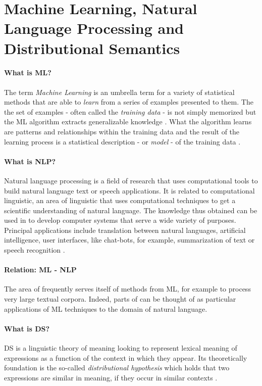 \documentclass{article}
\begin{document}
\section{Machine Learning, Natural Language Processing and Distributional Semantics}\hypertarget{sec2}{ }
\paragraph{What is ML?}
The term \emph{Machine Learning} is an umbrella term for a variety of statistical methods that are able to \emph{learn} from a series of examples presented to them. The the set of examples - often called the \emph{training data} - is not simply memorized but the ML algorithm extracts generalizable knowledge \cite{domingos2012few}.
 What the algorithm learns are patterns and relationships within the training data and the result of the learning process is a statistical description - or \emph{model} - of the training data \cite{fayyad2001digital}.
\paragraph{What is NLP?}
Natural language processing is a field of research that uses computational tools to build natural language text or speech applications. It is related to computational linguistic, an area of linguistic that uses computational techniques to get a scientific understanding of natural language. The knowledge thus obtained can be used in  to develop computer systems that serve a wide variety of purposes. Principal applications include translation between natural languages, artificial intelligence, user interfaces, like chat-bots, for example, summarization of text or speech recognition \cite{chowdhury2003natural}.
\paragraph{Relation: ML - NLP}
The area of  frequently serves itself of methods from ML, for example to process very large textual corpora. Indeed, parts of  can be thought of as particular applications of ML techniques to the domain of natural language.
\paragraph{What is DS?}
DS is a linguistic theory of meaning looking to represent lexical meaning of expressions as a function of the context in which they appear. Its theoretically foundation is the so-called \emph{distributional hypothesis} which holds that two expressions are similar in meaning, if they occur in similar contexts \cite{harris1954distributional}.
\end{document}
